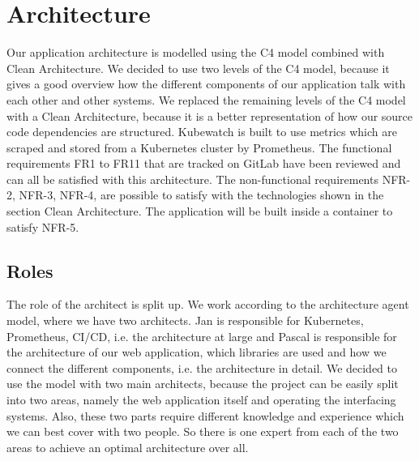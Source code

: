 \chapter{Architecture}



Our application architecture is modelled using the C4 model combined with Clean Architecture.
We decided to use two levels of the C4 model, because it gives a good overview how the different
components of our application talk with each other and other systems.
We replaced the remaining levels of the C4 model with a Clean Architecture,
because it is a better representation of how our source code dependencies are structured.
Kubewatch is built to use metrics which are scraped and stored from a Kubernetes cluster by Prometheus.
The functional requirements FR1 to FR11 that are tracked on GitLab have been reviewed and can all be satisfied with this architecture.
The non-functional requirements NFR-2, NFR-3, NFR-4, are possible to satisfy with the technologies shown in the section Clean Architecture.
The application will be built inside a container to satisfy NFR-5.

\section{Roles}
The role of the architect is split up. We work according to the architecture agent model, where we have two architects.
Jan is responsible for Kubernetes, Prometheus, CI/CD, i.e. the architecture at large
and Pascal is responsible for the architecture of our web application, which libraries are used and how we connect the different components, i.e. the architecture in detail.
We decided to use the model with two main architects, because the project can be easily split into two areas,
namely the web application itself and operating the interfacing systems.
Also, these two parts require different knowledge and experience which we can best cover with two people.
So there is one expert from each of the two areas to achieve an optimal architecture over all.

